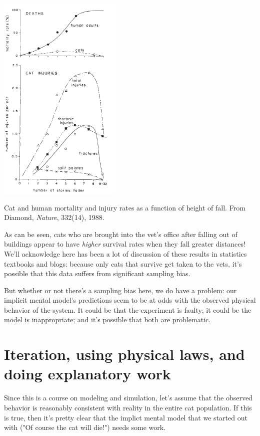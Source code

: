 \begin{marginfigure}
\includegraphics[height=10cm]{figs/DiamondFigure}

\caption{Cat and human mortality and injury rates as a function of height of fall.  From Diamond, {\it Nature}, 332(14), 1988.}
\end{marginfigure}

As can be seen, cats who are brought into the vet's office after
falling out of buildings appear to have {\it higher} survival rates
when they fall greater distances!  We'll acknowledge here has been a
lot of discussion of these results in statistics textbooks and blogs:
because only cats that survive get taken to the vets, it's possible
that this data suffers from significant sampling bias.

But whether or not there's a sampling bias here, we do have a problem:
our implicit mental model's predictions seem to be at odds with the
observed physical behavior of the system.  It could be that the
experiment is faulty; it could be the model is inappropriate; and it's
possible that both are problematic.

\section{Iteration, using physical laws, and doing explanatory work}

Since this is a course on modeling and simulation, let's assume that
the observed behavior is reasonably consistent with reality in the
entire cat population.  If this is true, then it's pretty clear that
the implict mental model that we started out with ("Of course the cat
will die!") needs some work.

